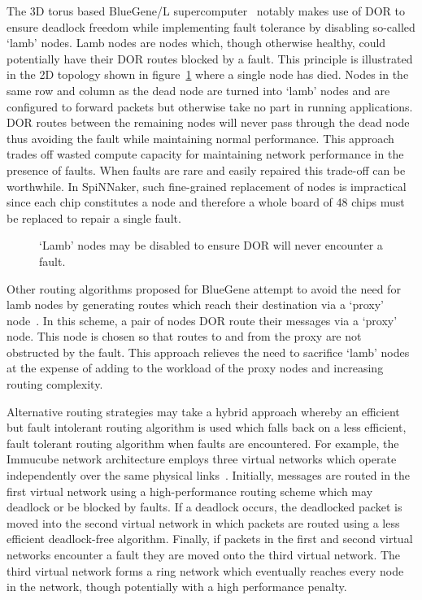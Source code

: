 			The 3D torus based BlueGene/L supercomputer~\cite{adiga02} notably makes
			use of DOR to ensure deadlock freedom while implementing fault tolerance
			by disabling so-called `lamb' nodes. Lamb nodes are nodes which, though
			otherwise healthy, could potentially have their DOR routes blocked by a
			fault. This principle is illustrated in the 2D topology shown in
			figure~\ref{fig:lamb-nodes} where a single node has died. Nodes in the
			same row and column as the dead node are turned into `lamb' nodes and are
			configured to forward packets but otherwise take no part in running
			applications. DOR routes between the remaining nodes will never pass
			through the dead node thus avoiding the fault while maintaining normal
			performance. This approach trades off wasted compute capacity for
			maintaining network performance in the presence of faults. When faults
			are rare and easily repaired this trade-off can be worthwhile. In
			SpiNNaker, such fine-grained replacement of nodes is impractical since
			each chip constitutes a node and therefore a whole board of 48 chips must
			be replaced to repair a single fault.
			
			\begin{figure}
				\center
				
				\caption[Avoiding faults using `lamb' nodes and DOR.]%
				{`Lamb' nodes may be disabled to ensure DOR will never
				encounter a fault.}
				\label{fig:lamb-nodes}
			\end{figure}
			
			Other routing algorithms proposed for BlueGene attempt to avoid the need
			for lamb nodes by generating routes which reach their destination via a
			`proxy' node~\cite{gomez04}. In this scheme, a pair of nodes DOR route
			their messages via a `proxy' node.  This node is chosen so that routes
			to and from the proxy are not obstructed by the fault.  This approach
			relieves the need to sacrifice `lamb' nodes at the expense of adding to
			the workload of the proxy nodes and increasing routing complexity.
			
			Alternative routing strategies may take a hybrid approach whereby an
			efficient but fault intolerant routing algorithm is used which falls back
			on a less efficient, fault tolerant routing algorithm when faults are
			encountered. For example, the Immucube network architecture employs three
			virtual networks which operate independently over the same physical
			links~\cite{puente07}. Initially, messages are routed in the first virtual
			network using a high-performance routing scheme which may deadlock or be
			blocked by faults.  If a deadlock occurs, the deadlocked packet is moved
			into the second virtual network in which packets are routed using a less
			efficient deadlock-free algorithm. Finally, if packets in the first and
			second virtual networks encounter a fault they are moved onto the third
			virtual network. The third virtual network forms a ring network which
			eventually reaches every node in the network, though potentially with a
			high performance penalty.
			
